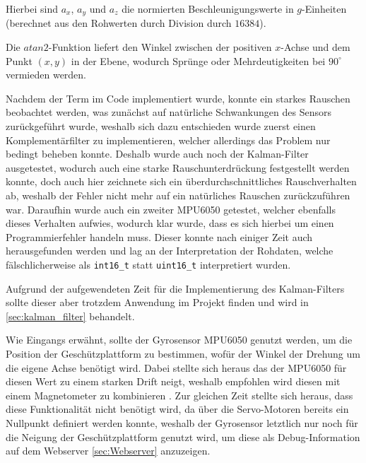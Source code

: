 Hierbei sind $a_x$, $a_y$ und $a_z$ die normierten Beschleunigungswerte in $\mathit{g}$-Einheiten (berechnet aus den Rohwerten durch Division durch $16384$). 

Die $atan2$-Funktion liefert den Winkel zwischen der positiven $x$-Achse und dem Punkt $(x, y)$ in der Ebene, wodurch Sprünge oder Mehrdeutigkeiten bei $90^\circ$ vermieden werden. \cite{raspberry_matlab_atan2}

Nachdem der Term im Code implementiert wurde, konnte ein starkes Rauschen beobachtet werden, was zunächst auf natürliche Schwankungen des Sensors zurückgeführt wurde, weshalb sich dazu entschieden wurde zuerst einen Komplementärfilter zu implementieren,
welcher allerdings das Problem nur bedingt beheben konnte. Deshalb wurde auch noch der Kalman-Filter ausgetestet, wodurch auch eine starke  Rauschunterdrückung festgestellt werden konnte, doch auch hier zeichnete sich ein überdurchschnittliches Rauschverhalten ab, weshalb der Fehler nicht mehr auf ein natürliches Rauschen zurückzuführen war.
Daraufhin wurde auch ein zweiter MPU6050 getestet, welcher ebenfalls dieses Verhalten aufwies, wodurch klar wurde, dass es sich hierbei um einen Programmierfehler handeln muss. Dieser konnte nach einiger Zeit auch herausgefunden werden und lag an der Interpretation der Rohdaten, 
welche fälschlicherweise als \texttt{int16\_t} statt \texttt{uint16\_t} interpretiert wurden.

Aufgrund der aufgewendeten Zeit für die Implementierung des Kalman-Filters sollte dieser aber trotzdem Anwendung im Projekt finden und wird in \ref{sec:kalman_filter} behandelt.

Wie Eingangs erwähnt, sollte der Gyrosensor MPU6050 genutzt werden, um die Position der Geschützplattform zu bestimmen, wofür der Winkel der Drehung um die eigene Achse benötigt wird. Dabei stellte sich heraus das der MPU6050 für diesen Wert zu einem starken Drift neigt, weshalb empfohlen wird diesen mit einem Magnetometer zu kombinieren \cite[S. 26]{raspberry_invensense_mpu6050_datasheet}.
Zur gleichen Zeit stellte sich heraus, dass diese Funktionalität nicht benötigt wird, da über die Servo-Motoren bereits ein Nullpunkt definiert werden konnte, weshalb der Gyrosensor letztlich nur noch für die Neigung der Geschützplattform genutzt wird, um diese als Debug-Information auf dem Webserver \ref{sec:Webserver} anzuzeigen.

